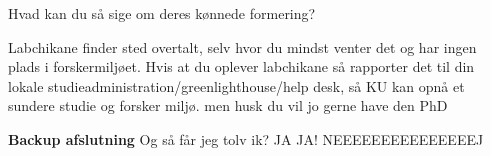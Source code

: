 \documentclass[a4paper,11pt]{article}
\begin{document}
\begin{sketch}
 Hvad kan du så sige om deres kønnede formering?


 Labchikane finder sted overtalt, selv hvor du mindst venter det og har ingen plads i forskermiljøet. Hvis at du oplever labchikane så rapporter det til din lokale studieadministration/greenlighthouse/help desk, så KU kan opnå et sundere studie og forsker miljø.   men husk du vil jo gerne have den PhD




\textbf{Backup afslutning}
 Og så får jeg tolv ik?
 JA JA!
 NEEEEEEEEEEEEEEEJ




\end{sketch}
\end{document}
